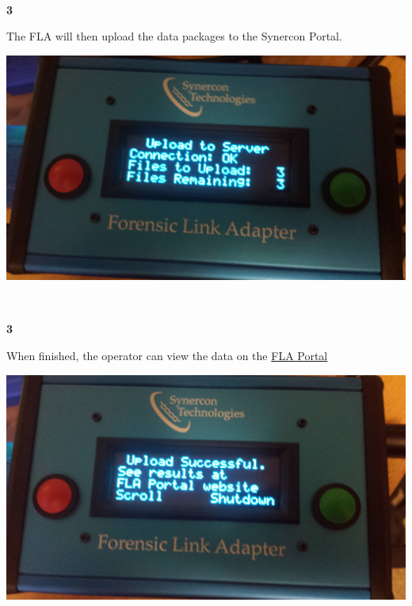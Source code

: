 \documentclass[11pt]{article}
\begin{document}
\\[\baselineskip]
\noindent\begin{minipage}{0.3\textwidth}%
\begin{center}
\textbf{3}\\[\baselineskip]
\end{center}
The FLA will then upload the data packages to the Synercon Portal.
\end{minipage}%
\hfill%
\begin{minipage}{0.6\textwidth}
\includegraphics[width=\linewidth]{../media/fla_screens/upload_uploading}
\end{minipage}
\\[\baselineskip]
\noindent\begin{minipage}{0.3\textwidth}%
\begin{center}
\textbf{3}\\[\baselineskip]
\end{center}
When finished, the operator can view the data on the \href{https://fla.synercontechnologies.com}{FLA Portal}
\end{minipage}%
\hfill%
\begin{minipage}{0.6\textwidth}
\includegraphics[width=\linewidth]{../media/fla_screens/upload_finished}
\end{minipage}
\end{document}
